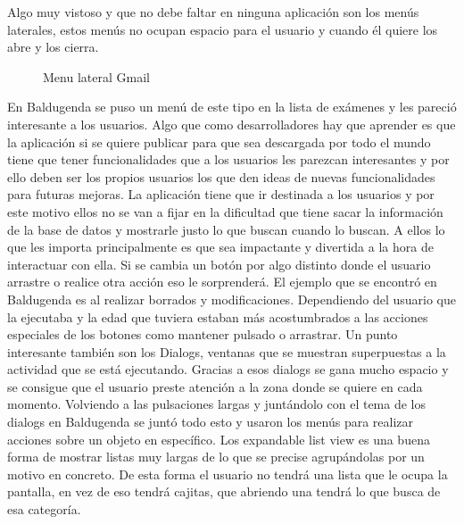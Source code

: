  
Algo muy vistoso y que no debe faltar en ninguna aplicación son los menús laterales, estos menús no ocupan espacio para el usuario y cuando él quiere los abre y los cierra.
\newpage
\begin{figure}[H] 
  \begin{center} 
    \caption{Menu lateral Gmail} 
    \label{fig:MenuLateral} 
  \end{center} 
\end{figure}

En Baldugenda se puso un menú de este tipo en la lista de exámenes y les pareció interesante a los usuarios.
Algo que como desarrolladores hay que aprender es que la aplicación si se quiere publicar para que sea descargada por todo el mundo tiene que tener funcionalidades que a los usuarios les parezcan interesantes y por ello deben ser los propios usuarios los que den ideas de nuevas funcionalidades para futuras mejoras. La aplicación tiene que ir destinada a los usuarios y por este motivo ellos no se van a fijar en la dificultad que tiene sacar la información de la base de datos y mostrarle justo lo que buscan cuando lo buscan.
A ellos lo que les importa principalmente es que sea impactante y divertida a la hora de interactuar con ella.
Si se cambia un botón por algo distinto donde el usuario arrastre o realice otra acción eso le sorprenderá.
El ejemplo que se encontró en Baldugenda es al realizar borrados y modificaciones.
Dependiendo del usuario que la ejecutaba y la edad que tuviera estaban más acostumbrados a las acciones especiales de los botones como mantener pulsado o arrastrar.
Un punto interesante también son los Dialogs, ventanas que se muestran superpuestas a la actividad que se está ejecutando. Gracias a esos dialogs se gana mucho espacio y se consigue que el usuario preste atención a la zona donde se quiere en cada momento.
Volviendo a las pulsaciones largas y juntándolo con el tema de los dialogs en Baldugenda se juntó todo esto y usaron los menús para realizar acciones sobre un objeto en específico.
Los expandable list view es una buena forma de mostrar listas muy largas de lo que se precise agrupándolas por un motivo en concreto.
De esta forma el usuario no tendrá una lista que le ocupa la pantalla, en vez de eso tendrá cajitas, que abriendo una tendrá lo que busca de esa categoría.


